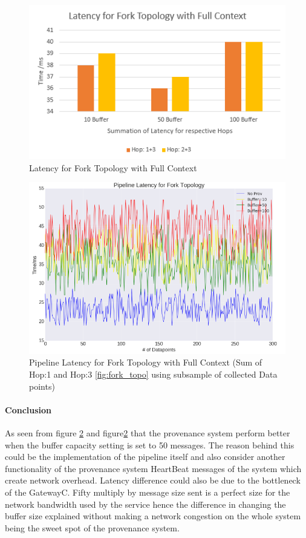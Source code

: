 \begin{figure}[H]
	\center
	\includegraphics[width=\textwidth]{figures/buffer-fork.PNG}
	\caption{Latency for Fork Topology with Full Context}
	\label{fig:forktopo_latency_buffer_bar}
\end{figure}

\begin{figure}[H]
	\center
	\includegraphics[width=\textwidth]{figures/pipeline_buffer.png}
	\caption{Pipeline Latency for Fork Topology with Full Context (Sum of Hop:1 and Hop:3 \ref{fig:fork_topo} using subsample of collected Data points)}
	\label{fig:forktopo_latency_buffer}
\end{figure}


\paragraph*{Conclusion}
As seen from figure \ref{fig:forktopo_latency_buffer} and figure\ref{fig:forktopo_latency_buffer} that the provenance system perform better when the buffer capacity setting is set to 50 messages. The reason behind this could be the implementation of the pipeline itself and also consider another functionality of the provenance system HeartBeat messages of the system which create network overhead. Latency difference could also be due to the bottleneck of the GatewayC. Fifty multiply by message size sent is a perfect size for the network bandwidth used by the service hence the difference in changing the buffer size explained without making a network congestion on the whole system being the sweet spot of the provenance system.


